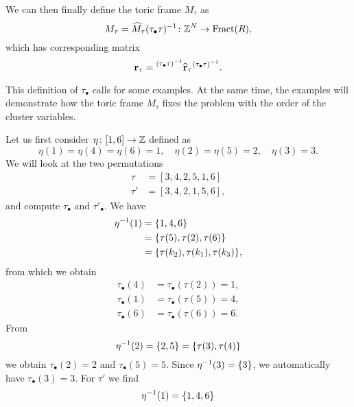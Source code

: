 We can then finally define the toric frame $M_\tau$ as
\begin{equation*}
	M_\tau = \widehat{M}_\tau (\tau_\bullet \tau)^{-1} \colon \mathbb{Z}^N \to \operatorname{Fract}(R),
\end{equation*}
which has corresponding matrix
\begin{equation*}
	\mathbf{r}_\tau = \prescript{(\tau_\bullet \tau)^{-1}}{}{ \widehat{\mathbf{r}}_\tau} ^{(\tau_\bullet \tau)^{-1}}.
\end{equation*}

This definition of $\tau_\bullet$ calls for some examples. At the same time, the
examples will demonstrate how the toric frame $M_\tau$ fixes the problem with the order
of the cluster variables.

\begin{example}
	Let us first consider $\eta \colon [1, 6] \to \mathbb{Z}$ defined as
	\begin{equation*}
		\eta(1) = \eta(4) = \eta(6) = 1, \quad \eta(2) = \eta(5) = 2, \quad \eta(3) = 3.
	\end{equation*}
	We will look at the two permutations
	\begin{align*}
		\tau  & = [3,4,2,5,1,6]  \\
		\tau' & = [3,4,2,1,5,6],
	\end{align*}
	and compute $\tau_\bullet$ and $\tau'_\bullet$. We have
	\begin{align*}
		\eta^{-1}(1) & = \{1, 4, 6\}                          \\
		            & = \{\tau(5), \tau(2), \tau(6)\}        \\
		            & = \{\tau(k_2), \tau(k_1), \tau(k_3)\},
	\end{align*}
	from which we obtain
	\begin{align*}
		\tau_\bullet(4) & = \tau_\bullet(\tau(2)) = 1, \\
		\tau_\bullet(1) & = \tau_\bullet(\tau(5)) = 4, \\
		\tau_\bullet(6) & = \tau_\bullet(\tau(6)) = 6.
	\end{align*}
	From
	\begin{equation*}
		\eta^{-1}(2) = \{2, 5\} = \{\tau(3), \tau(4)\}
	\end{equation*}
	we obtain $\tau_\bullet(2) = 2$ and $\tau_\bullet(5) = 5$. Since $\eta^{-1}(3) = \{3\}$,
	we automatically have $\tau_\bullet(3) = 3$. For $\tau'$ we find
	\begin{align*}
		\eta\inv(1) & = \{1, 4, 6\}                             \\

\end{align*}
\end{example}
